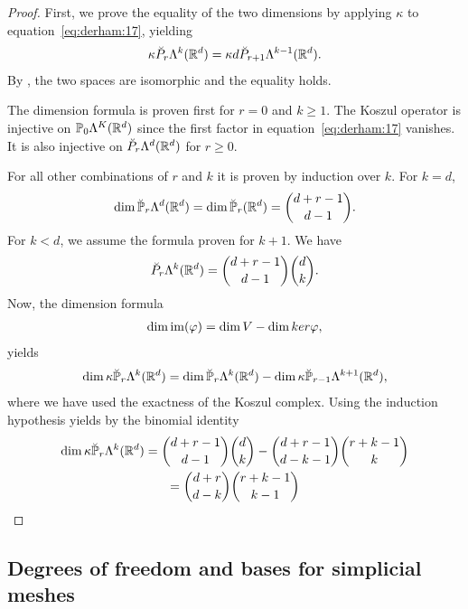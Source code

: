\begin{proof}
  First, we prove the equality of the two dimensions by applying $\kappa$
  to equation~\eqref{eq:derham:17}, yielding
  \begin{gather*}
    \kappa \breve P_r\Lambda^k(\mathbb R^d)
    = \kappa d \breve P_{r+1}\Lambda^{k-1}(\mathbb R^d).
  \end{gather*}
  By , the two spaces are
  isomorphic and the equality holds.

  The dimension formula is proven first for $r=0$ and $k\ge 1$. The
  Koszul operator is injective on $\mathbb P_0\Lambda^K(\mathbb R^d)$ since the
  first factor in equation~\eqref{eq:derham:17} vanishes. It is
  also injective on $\breve P_r\Lambda^d(\mathbb R^d)$ for $r\ge 0$.

  For all other combinations of $r$ and $k$ it is proven by induction
  over $k$. For $k=d$,
  \begin{gather*}
    \dim \breve{\mathbb P}_r\Lambda^d(\mathbb R^d) = \dim\breve{\mathbb P}_r(\mathbb R^d)
    = \binom{d+r-1}{d-1}.
  \end{gather*}
  For $k<d$, we assume the formula proven for $k+1$. We have
  \begin{gather*}
    \breve P_r\Lambda^k(\mathbb R^d) = \binom{d+r-1}{d-1}\binom{d}{k}.
  \end{gather*}
  Now, the dimension formula
  \begin{gather*}
    \dim \operatorname{im}(\varphi) = \dim V - \dim ker \varphi,
  \end{gather*}
  yields
  \begin{gather*}
    \dim\kappa\breve {\mathbb P}_r\Lambda^k(\mathbb R^d) =
    \dim\breve {\mathbb P}_r\Lambda^k(\mathbb R^d)
    - \dim\kappa\breve {\mathbb P}_{r-1}\Lambda^{k+1}(\mathbb R^d),
  \end{gather*}
  where we have used the exactness of the Koszul complex.
  Using the induction hypothesis yields by the binomial identity
  \begin{multline*}
    \dim\kappa\breve {\mathbb P}_r\Lambda^k(\mathbb R^d) =
    \binom{d+r-1}{d-1}\binom{d}{k}
    - \binom{d+r-1}{d-k-1}\binom{r+k-1}{k}
    \\
    = \binom{d+r}{d-k}\binom{r+k-1}{k-1}
  \end{multline*}
\end{proof}

\subsection{Degrees of freedom and bases for simplicial meshes}

